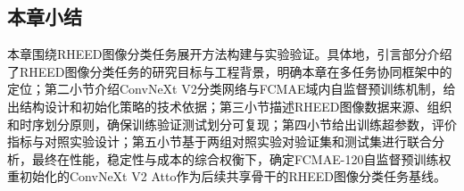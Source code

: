 \subsection{本章小结}
\label{subsec:cp2_summary}
本章围绕RHEED图像分类任务展开方法构建与实验验证。具体地，引言部分介绍了RHEED图像分类任务的研究目标与工程背景，明确本章在多任务协同框架中的定位；第二小节介绍ConvNeXt V2分类网络与FCMAE域内自监督预训练机制，给出结构设计和初始化策略的技术依据；第三小节描述RHEED图像数据来源、组织和时序划分原则，确保训练验证测试划分可复现；第四小节给出训练超参数，评价指标与对照实验设计；第五小节基于两组对照实验对验证集和测试集进行联合分析，最终在性能，稳定性与成本的综合权衡下，确定FCMAE-120自监督预训练权重初始化的ConvNeXt V2 Atto作为后续共享骨干的RHEED图像分类任务基线。